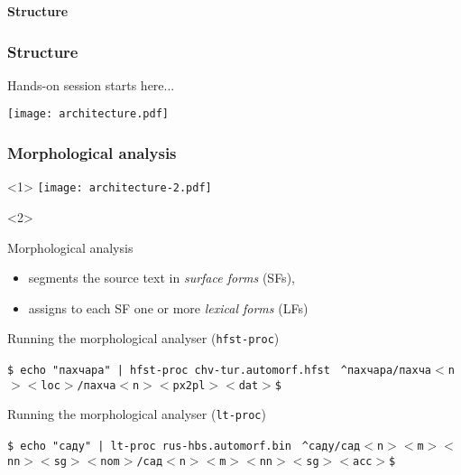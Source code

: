 \documentclass[10pt,xetex]{beamer} %
\begin{document}
\begin{frame} %
 \begin{center}
 {\Large {\bf Structure}}
 \end{center}
\end{frame}

\begin{frame}
  \frametitle{Structure}

    Hands-on session starts here...

\texttt{[image: architecture.pdf]}


\end{frame}



\begin{frame}
  \frametitle{Morphological analysis}

\begin{onlyenv}<1>
\texttt{[image: architecture-2.pdf]}
\end{onlyenv}
\begin{onlyenv}<2>

  \begin{block}{Morphological analysis}
 \begin{itemize}
   \item segments the source text in \emph{surface forms} (SFs),  
   \item assigns to each SF one or more \emph{lexical forms} (LFs)
 \end{itemize}
  \end{block}
  \begin{block}{Running the morphological analyser ({\tt hfst-proc})} %
  \begin{small}
    \texttt{\$ echo "пахчара" | hfst-proc chv-tur.automorf.hfst}
    \texttt{ \^{}пахчара/пахча$<$n$><$loc$>$/пахча$<$n$><$px2pl$><$dat$>$\$}
  \end{small}
  \end{block}
  \begin{block}{Running the morphological analyser ({\tt lt-proc})}
  \begin{small}
    \texttt{\$ echo "саду" | lt-proc rus-hbs.automorf.bin}
    \texttt{ \^{}саду/сад$<$n$><$m$><$nn$><$sg$><$nom$>$/сад$<$n$><$m$><$nn$><$sg$><$acc$>$\$}
  \end{small}
  \end{block}
\end{onlyenv}

\end{frame}
\end{document}
